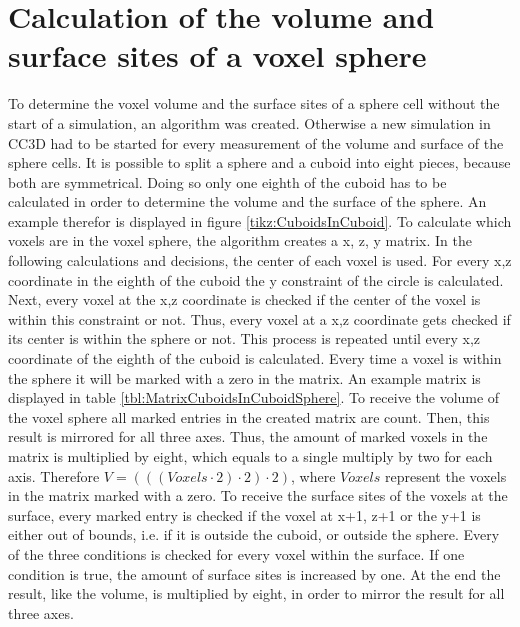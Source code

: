 \section{Calculation of the volume and surface sites of a voxel sphere}\label{sec:CreatedAlgorithm}
To determine the voxel volume and the surface sites of a sphere cell without the start of a simulation, an algorithm was created. Otherwise a new simulation in \ac{CC3D} had to be started for every measurement of the volume and surface of the sphere cells. \newline
It is possible to split a sphere and a cuboid into eight pieces, because both are symmetrical. Doing so only one eighth of the cuboid has to be calculated in order to determine the volume and the surface of the sphere. An example therefor is displayed in figure \ref{tikz:CuboidsInCuboid}. \newline
To calculate which voxels are in the voxel sphere, the algorithm creates a x, z, y matrix. In the following calculations and decisions, the center of each voxel is used. For every x,z coordinate in the eighth of the cuboid the y constraint of the circle is calculated. Next, every voxel at the x,z coordinate is checked if the center of the voxel is within this constraint or not. Thus, every voxel at a x,z coordinate gets checked if its center is within the sphere or not. This process is repeated until every x,z coordinate of the eighth of the cuboid is calculated. Every time a voxel is within the sphere it will be marked with a zero in the matrix. An example matrix is displayed in table \ref{tbl:MatrixCuboidsInCuboidSphere}. \newline
To receive the volume of the voxel sphere all marked entries in the created matrix are count. Then, this result is mirrored for all three axes. Thus, the amount of marked voxels in the matrix is multiplied by eight, which equals to a single multiply by two for each axis. Therefore $V=(((Voxels \cdot 2) \cdot 2) \cdot 2)$, where $Voxels$ represent the voxels in the matrix marked with a zero.
To receive the surface sites of the voxels at the surface, every marked entry is checked if the voxel at x+1, z+1 or the y+1 is either out of bounds, i.e. if it is outside the cuboid, or outside the sphere. Every of the three conditions is checked for every voxel within the surface. If one condition is true, the amount of surface sites is increased by one. At the end the result, like the volume, is multiplied by eight, in order to mirror the result for all three axes.




